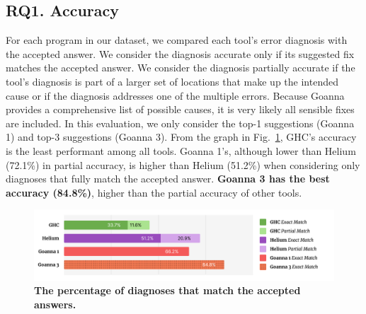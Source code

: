     


 	\subsection{RQ1. Accuracy}\label{sub:eval-accuracy}
 	For each program in our dataset, we compared each tool's error diagnosis with the accepted answer. We consider the diagnosis accurate only if its suggested fix matches the accepted answer. We consider the diagnosis partially accurate if the tool's diagnosis is part of a larger set of locations that make up the intended cause or if the diagnosis addresses one of the multiple errors. Because Goanna provides a comprehensive list of possible causes, it is very likely all sensible fixes are included. In this evaluation, we only consider the top-1 suggestions (Goanna 1) and top-3 suggestions (Goanna 3).  From the graph in Fig.~\ref{fig:accuracy}, GHC's accuracy is the least performant among all tools. Goanna 1's, although lower than Helium (72.1\%) in partial accuracy, is higher than Helium (51.2\%) when considering only diagnoses that fully match the accepted answer. \textbf{Goanna 3 has the best accuracy (84.8\%)}, higher than the partial accuracy of other tools.
  
     \begin{figure}[htb!]
        \centering
        \includegraphics[width=\linewidth]{images/Accuracy}
        \caption{\textbf{The percentage of diagnoses that match the accepted answers.} }
        \label{fig:accuracy}
    \end{figure}


 	


